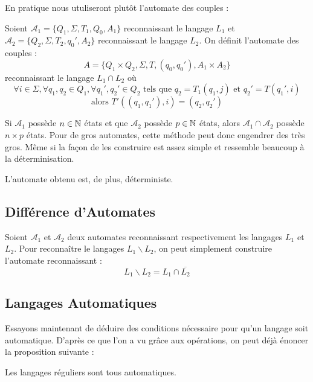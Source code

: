 En pratique nous utuliseront plutôt l'automate des couples : 

\begin{definition}
    Soient $ \mathcal{A}_1 = \{Q_1, \Sigma, T_1, Q_0, A_1\}$ reconnaissant le langage $L_1$ et 
    $ \mathcal{A}_2 = \{Q_2, \Sigma, T_2, q_0', A_2\}$ reconnaissant le langage $L_2$. On définit 
    l'automate des couples : 
        \[ A = \{Q_1 \times Q_2, \Sigma, T, (q_0,q_0'), A_1 \times A_2\} \] 
    reconnaissant le langage $L_1 \cap L_2$ où 
        \[ \forall i \in \Sigma, \forall q_1, q_2 \in Q_1, \forall q_1', q_2' \in Q_2 \text{ tels que } q_2 = T_1(q_1,j) \text{ et } q_2' = T(q_1',i) \]
        \[ \text{alors } T'((q_1, q_1'), i) = (q_2, q_2') \] 
\end{definition}

\begin{proposition}
    Si $ \mathcal{A}_1$ possède $n \in \mathbb{N}$ états et que $ \mathcal{A}_2$ possède $p \in \mathbb{N}$ états, alors 
    $ \mathcal{A}_1 \cap \mathcal{A}_2$ possède $n \times p$ états. 
    Pour de gros automates, cette méthode peut donc engendrer des très gros. 
    Même si la façon de les construire est assez simple et ressemble beaucoup à la déterminisation. 

    L'automate obtenu est, de plus, déterministe. 
\end{proposition}


\subsection{Différence d'Automates}

\begin{proposition}
    Soient $ \mathcal{A}_1$ et  $ \mathcal{A}_2$ deux automates reconnaissant respectivement les langages $L_1$ et $L_2$. 
    Pour reconnaître le langages $L_1 \backslash L_2$, on peut simplement construire l'automate reconnaissant :
        \[ L_1 \backslash L_2 = L_1 \cap \overline{L_2} \] 
\end{proposition}

\subsection{Langages Automatiques}

Essayons maintenant de déduire des conditions nécessaire pour qu'un langage soit automatique. 
D'après ce que l'on a vu grâce aux opérations, on peut déjà énoncer la proposition suivante : 
\begin{proposition}
    Les langages réguliers sont tous automatiques. 
\end{proposition}

